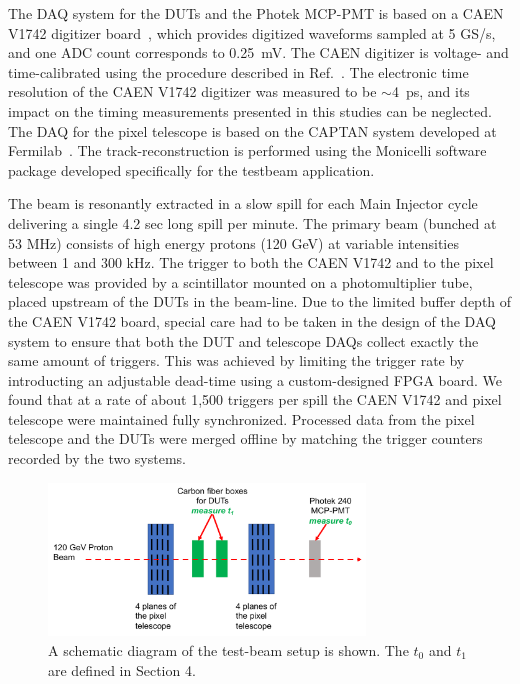 \documentclass[preprint,1p]{elsarticle}
\begin{document}
The DAQ system for the DUTs and the Photek MCP-PMT is based on a CAEN V1742
digitizer board~\cite{CAENDRS}, which provides digitized waveforms sampled at 5
GS/s, and one ADC count corresponds to 0.25~mV. The CAEN digitizer is voltage-
and time-calibrated using the procedure described in Ref.~\cite{Kim201467}. The
electronic time resolution of the CAEN V1742 digitizer was measured to be
$\sim$4~ps, and its impact on the timing measurements presented in this studies
can be neglected. The DAQ for the pixel telescope is based on the CAPTAN system
developed at Fermilab~\cite{KWAN2016162}. The track-reconstruction is performed
using the Monicelli software package developed specifically for the testbeam
application. 

The beam is resonantly extracted in a slow spill for each Main Injector cycle
delivering a single 4.2 sec long spill per minute. The primary beam (bunched at
53 MHz) consists of high energy protons (120 GeV) at variable intensities
between 1 and 300 kHz. The trigger to both the CAEN V1742 and to the pixel
telescope was provided by a scintillator mounted on a photomultiplier tube,
placed upstream of the DUTs in the beam-line. Due to the limited buffer depth of
the CAEN V1742 board, special care had to be taken in the design of the DAQ
system to ensure that both the DUT and telescope DAQs collect exactly the same
amount of triggers. This was achieved by limiting the trigger rate by
introducting an adjustable dead-time using a custom-designed FPGA board. We
found that at a rate of about 1,500 triggers per spill the CAEN V1742 and pixel
telescope were maintained fully synchronized. Processed data from the pixel
telescope and the DUTs were merged offline by matching the trigger counters
recorded by the two systems.


\begin{figure}[htbp] 
\centering
\includegraphics[width=0.75\textwidth]{figs/BeamSetup.pdf} 
\caption{A schematic diagram of the test-beam setup is shown. The $t_0$ and $t_1$ are defined in Section 4.} 
\label{fig:DragonBox} 
\end{figure} 
\end{document}
